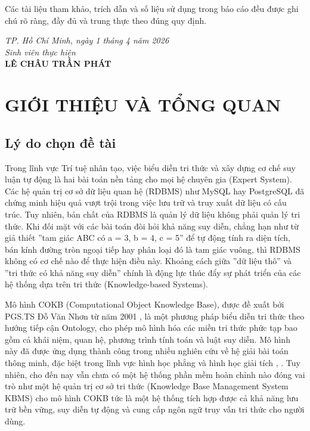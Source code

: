 \documentclass[13pt,a4paper,oneside]{extreport}
\begin{document}
\noindent Các tài liệu tham khảo, trích dẫn và số liệu sử dụng trong báo cáo đều được ghi chú rõ ràng, đầy đủ và trung thực theo đúng quy định.

\vspace{3cm}
\begin{flushright}
    \textit{TP. Hồ Chí Minh, ngày 1 tháng 4 năm 2026}\\[0.5cm]
    \textit{Sinh viên thực hiện}\\[1.5cm]
    \textbf{LÊ CHÂU TRẦN PHÁT}
\end{flushright}
\clearpage

\cleardoublepage
{}
{}
\listoffigures
\clearpage

\cleardoublepage
{}
{}
\listoftables
\clearpage

\cleardoublepage
{}
{}
\tableofcontents
\clearpage
{}
\chapter{GIỚI THIỆU VÀ TỔNG QUAN}

\section{Lý do chọn đề tài}


Trong lĩnh vực Trí tuệ nhân tạo, việc biểu diễn tri thức và xây dựng cơ chế suy luận tự động là hai bài toán nền tảng cho mọi hệ chuyên gia (Expert System). Các hệ quản trị cơ sở dữ liệu quan hệ (RDBMS) như MySQL hay PostgreSQL đã chứng minh hiệu quả vượt trội trong việc lưu trữ và truy xuất dữ liệu có cấu trúc. Tuy nhiên, bản chất của RDBMS là quản lý dữ liệu  không phải quản lý tri thức. Khi đối mặt với các bài toán đòi hỏi khả năng suy diễn, chẳng hạn như từ giả thiết ''tam giác ABC có a = 3, b = 4, c = 5'' để tự động tính ra diện tích, bán kính đường tròn ngoại tiếp hay phân loại đó là tam giác vuông, thì RDBMS không có cơ chế nào để thực hiện điều này. Khoảng cách giữa ''dữ liệu thô'' và ''tri thức có khả năng suy diễn'' chính là động lực thúc đẩy sự phát triển của các hệ thống dựa trên tri thức (Knowledge-based Systems).


Mô hình COKB (Computational Object Knowledge Base), được đề xuất bởi PGS.TS Đỗ Văn Nhơn từ năm 2001 \cite{DoVanNhon1}, là một phương pháp biểu diễn tri thức theo hướng tiếp cận Ontology, cho phép mô hình hóa các miền tri thức phức tạp bao gồm cả khái niệm, quan hệ, phương trình tính toán và luật suy diễn. Mô hình này đã được ứng dụng thành công trong nhiều nghiên cứu về hệ giải bài toán thông minh, đặc biệt trong lĩnh vực hình học phẳng và hình học giải tích \cite{Dvn_Ijcsi}, \cite{Dvn_Somet}. Tuy nhiên, cho đến nay vẫn chưa có một hệ thống phần mềm hoàn chỉnh nào đóng vai trò như một hệ quản trị cơ sở tri thức (Knowledge Base Management System  KBMS) cho mô hình COKB  tức là một hệ thống tích hợp được cả khả năng lưu trữ bền vững, suy diễn tự động và cung cấp ngôn ngữ truy vấn tri thức cho người dùng.
\end{document}
